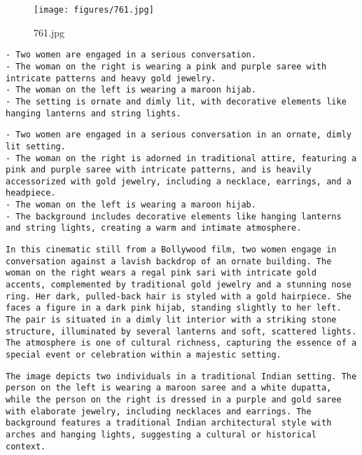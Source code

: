 \clearpage
\begin{figure}[H]
    \centering
    \texttt{[image: figures/761.jpg]}
    \caption{761.jpg}
    \label{fig:761.jpg}
\end{figure}



\begin{lstlisting}[caption={Captions using Ensemble without Llama for 761.jpg}]
- Two women are engaged in a serious conversation.
- The woman on the right is wearing a pink and purple saree with intricate patterns and heavy gold jewelry.
- The woman on the left is wearing a maroon hijab.
- The setting is ornate and dimly lit, with decorative elements like hanging lanterns and string lights.
\end{lstlisting}


\begin{lstlisting}[caption={Captions using Ensemble with Llama for 761.jpg}]
- Two women are engaged in a serious conversation in an ornate, dimly lit setting.
- The woman on the right is adorned in traditional attire, featuring a pink and purple saree with intricate patterns, and is heavily accessorized with gold jewelry, including a necklace, earrings, and a headpiece.
- The woman on the left is wearing a maroon hijab.
- The background includes decorative elements like hanging lanterns and string lights, creating a warm and intimate atmosphere.
\end{lstlisting}


\begin{lstlisting}[caption={Captions using Llama 3.2 for 761.jpg}]
In this cinematic still from a Bollywood film, two women engage in conversation against a lavish backdrop of an ornate building. The woman on the right wears a regal pink sari with intricate gold accents, complemented by traditional gold jewelry and a stunning nose ring. Her dark, pulled-back hair is styled with a gold hairpiece. She faces a figure in a dark pink hijab, standing slightly to her left. The pair is situated in a dimly lit interior with a striking stone structure, illuminated by several lanterns and soft, scattered lights. The atmosphere is one of cultural richness, capturing the essence of a special event or celebration within a majestic setting.
\end{lstlisting}


\begin{lstlisting}[caption={Captions using Phi 4 for 761.jpg}]
The image depicts two individuals in a traditional Indian setting. The person on the left is wearing a maroon saree and a white dupatta, while the person on the right is dressed in a purple and gold saree with elaborate jewelry, including necklaces and earrings. The background features a traditional Indian architectural style with arches and hanging lights, suggesting a cultural or historical context.
\end{lstlisting}


